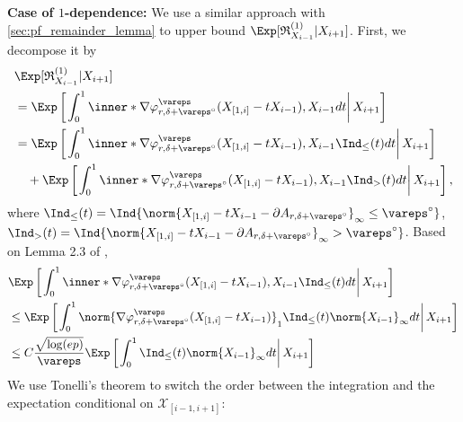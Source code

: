 \documentclass[aos]{imsart}
\begin{document}
\begin{appendix}
\medskip
{\bf Case of $1$-dependence:}
We use a similar approach with \cref{sec:pf_remainder_lemma} to upper bound $\Exp[ \mathfrak{R}_{X_{i-1}}^{(1)} | X_{i+1} ]$. First, we decompose it by
\begin{equation*}
\begin{aligned}
    & \Exp[ \mathfrak{R}_{X_{i-1}}^{(1)} | X_{i+1} ] \\ 
    & = \Exp\left[ \left. \int_0^1 \inner*{
            \nabla \varphi_{r,\delta+\vareps^\circ}^\vareps(X_{[1,i]} - t X_{i-1}),
            X_{i-1}
        } dt \right| X_{i+1} \right] \\
    & = \Exp\left[ \left. \int_0^1 \inner*{
            \nabla \varphi_{r,\delta+\vareps^\circ}^\vareps(X_{[1,i]} - t X_{i-1}),
            X_{i-1}
        } \Ind_\leq(t) dt \right| X_{i+1} \right] \\
    & \quad + \Exp\left[ \left. \int_0^1 \inner*{
            \nabla \varphi_{r,\delta+\vareps^\circ}^\vareps(X_{[1,i]} - t X_{i-1}),
            X_{i-1}
        } \Ind_>(t) dt \right| X_{i+1} \right], 
\end{aligned}
\end{equation*}
where $\Ind_\leq(t) = \Ind\{\norm{X_{[1,i]} - t X_{i-1} - \partial A_{r,\delta+\vareps^\circ}}_\infty \leq \vareps^\circ\}$, $\Ind_>(t) = \Ind\{\norm{X_{[1,i]} - t X_{i-1} - \partial A_{r,\delta+\vareps^\circ}}_\infty > \vareps^\circ\}$.
Based on Lemma 2.3 of \citet{fang2020large}, 
\begin{equation*}
\begin{aligned}
    & \Exp\left[ \left. \int_0^1 
        \inner*{
            \nabla \varphi_{r,\delta+\vareps^\circ}^\vareps(X_{[1,i]} - t X_{i-1}),
            X_{i-1}
        } 
        \Ind_\leq(t) 
    dt \right| X_{i+1} \right] \\
    & \leq \Exp\left[ \left. \int_0^1 
        \norm{\nabla \varphi_{r,\delta+\vareps^\circ}^\vareps(X_{[1,i]} - t X_{i-1})}_1 \Ind_\leq(t)
        \norm{X_{i-1}}_\infty 
    dt \right| X_{i+1} \right] \\
    & \leq C \frac{\sqrt{\log(ep)}}{\vareps} \Exp\left[ \left. \int_0^1 
        \Ind_\leq(t)
        \norm{X_{i-1}}_\infty 
    dt \right| X_{i+1} \right] \\
\end{aligned}
\end{equation*}
We use Tonelli's theorem to switch the order between the integration and the expectation conditional on $\mathscr{X}_{[i-1, i+1]}$:
\begin{equation*}

\end{equation*}
\end{appendix}
\end{document}
